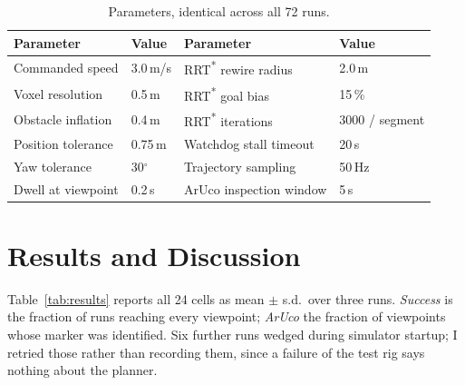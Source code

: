 \documentclass[11pt,a4paper]{article}
\begin{document}
\begin{table}[H]
\centering\small
\caption{Parameters, identical across all 72 runs.}
\label{tab:params}
\begin{tabular}{llll}
\toprule
\textbf{Parameter} & \textbf{Value} & \textbf{Parameter} & \textbf{Value} \\
\midrule
Commanded speed    & 3.0\,m/s   & RRT\textsuperscript{*} rewire radius & 2.0\,m \\
Voxel resolution   & 0.5\,m     & RRT\textsuperscript{*} goal bias     & 15\,\% \\
Obstacle inflation & 0.4\,m     & RRT\textsuperscript{*} iterations    & 3000 / segment \\
Position tolerance & 0.75\,m    & Watchdog stall timeout               & 20\,s \\
Yaw tolerance      & 30$^\circ$ & Trajectory sampling                  & 50\,Hz \\
Dwell at viewpoint & 0.2\,s     & ArUco inspection window              & 5\,s \\
\bottomrule
\end{tabular}
\end{table}

\section{Results and Discussion}

Table~\ref{tab:results} reports all 24 cells as mean $\pm$ s.d.\ over three runs. \emph{Success} is the fraction of runs reaching every viewpoint; \emph{ArUco} the fraction of viewpoints whose marker was identified. Six further runs wedged during simulator startup; I retried those rather than recording them, since a failure of the test rig says nothing about the planner.
\end{document}
